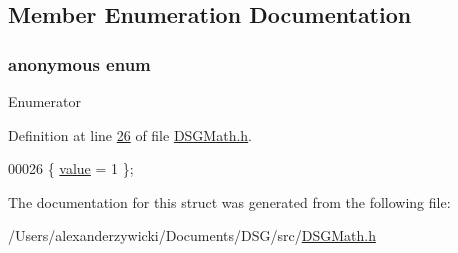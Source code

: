 \subsection{Member Enumeration Documentation}
\hypertarget{struct_d_s_g_1_1_factorial_3_010_01_4_a6bfe1b9c1bfc0bdeaceb03842acb1927}{\subsubsection[{anonymous enum}]{\setlength{\rightskip}{0pt plus 5cm}anonymous enum}}\label{struct_d_s_g_1_1_factorial_3_010_01_4_a6bfe1b9c1bfc0bdeaceb03842acb1927}
\begin{Desc}
\item[Enumerator]\par
\begin{description}
\item[{\em 
\hypertarget{struct_d_s_g_1_1_factorial_3_010_01_4_a6bfe1b9c1bfc0bdeaceb03842acb1927abba93a0ae84b21f3c62dd8baa14039eb}{value}\label{struct_d_s_g_1_1_factorial_3_010_01_4_a6bfe1b9c1bfc0bdeaceb03842acb1927abba93a0ae84b21f3c62dd8baa14039eb}
}]\end{description}
\end{Desc}


Definition at line \hyperlink{_d_s_g_math_8h_source_l00026}{26} of file \hyperlink{_d_s_g_math_8h_source}{D\+S\+G\+Math.\+h}.


\begin{DoxyCode}
00026 \{ \hyperlink{struct_d_s_g_1_1_factorial_3_010_01_4_a6bfe1b9c1bfc0bdeaceb03842acb1927abba93a0ae84b21f3c62dd8baa14039eb}{value} = 1 \};
\end{DoxyCode}


The documentation for this struct was generated from the following file\+:\begin{DoxyCompactItemize}
\item 
/\+Users/alexanderzywicki/\+Documents/\+D\+S\+G/src/\hyperlink{_d_s_g_math_8h}{D\+S\+G\+Math.\+h}\end{DoxyCompactItemize}
